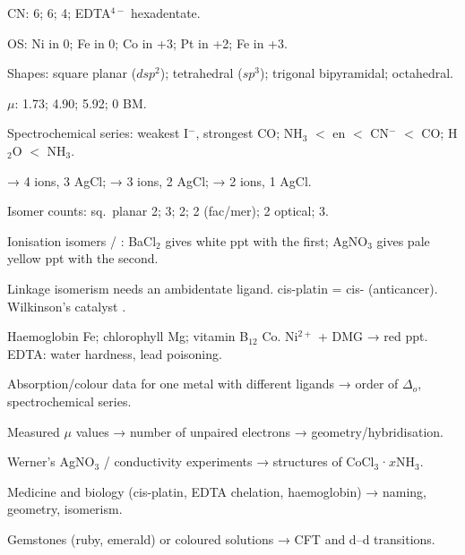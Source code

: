 \documentclass[10pt,a4paper]{extarticle}
\begin{document}
\begin{multicols}{2}
\begin{fl}
\item CN:  6;  6; \ce{[Ni(CO)4]} 4; EDTA$^{4-}$ hexadentate.
\item OS: Ni in \ce{[Ni(CO)4]} 0; Fe in \ce{[Fe(CO)5]} 0; Co in \ce{[CoCl2(en)2]+} +3; Pt in \ce{[Pt(NH3)2Cl2]} +2; Fe in  +3.
\item Shapes:  square planar ($dsp^2$);  tetrahedral ($sp^3$); \ce{[Fe(CO)5]} trigonal bipyramidal; \ce{[Cr(CO)6]} octahedral.
\item $\mu$:  1.73;  4.90;  5.92;  0 BM.
\item Spectrochemical series: weakest I$^-$, strongest CO; NH$_3$ $<$ en $<$ CN$^-$ $<$ CO; H$_2$O $<$ NH$_3$.
\item {} → 4 ions, 3 AgCl;  → 3 ions, 2 AgCl;  → 2 ions, 1 AgCl.
\item Isomer counts: \ce{[MA2B2]} sq.\ planar 2; \ce{[MABCD]} 3; \ce{[MA4B2]} 2; \ce{[MA3B3]} 2 (fac/mer); \ce{[M(AA)3]} 2 optical; \ce{[M(AA)2B2]} 3.
\item Ionisation isomers  / : BaCl$_2$ gives white ppt with the first; AgNO$_3$ gives pale yellow ppt with the second.
\item Linkage isomerism needs an ambidentate ligand. cis-platin = cis-\ce{[Pt(NH3)2Cl2]} (anticancer). Wilkinson's catalyst .
\item Haemoglobin Fe; chlorophyll Mg; vitamin B$_{12}$ Co. Ni$^{2+}$ + DMG → red ppt. EDTA: water hardness, lead poisoning.
\end{fl}

\begin{fl}
\item Absorption/colour data for one metal with different ligands → order of $\Delta_o$, spectrochemical series.
\item Measured $\mu$ values → number of unpaired electrons → geometry/hybridisation.
\item Werner's AgNO$_3$ / conductivity experiments → structures of CoCl$_3$·$x$NH$_3$.
\item Medicine and biology (cis-platin, EDTA chelation, haemoglobin) → naming, geometry, isomerism.
\item Gemstones (ruby, emerald) or coloured solutions → CFT and d--d transitions.
\end{fl}


\end{multicols}
\end{document}
